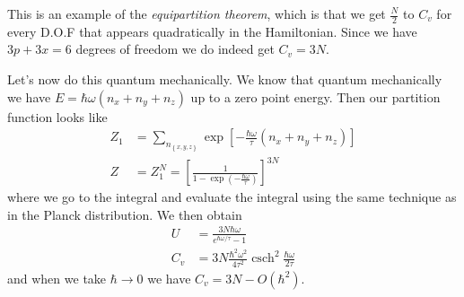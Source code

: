 \documentclass[10pt,twocolumn]{article}
\DeclareMathOperator{\csch}{csch}
\begin{document}
This is an example of the \emph{equipartition theorem}, which is that we get $\frac{N}{2}$ to $C_v$ for every D.O.F that appears quadratically in the Hamiltonian. Since we have $3p + 3x = 6$ degrees of freedom we do indeed get $C_v = 3N$.

Let's now do this quantum mechanically. We know that quantum mechanically we have $E = \hbar \omega\left( n_x + n_y + n_z \right)$ up to a zero point energy. Then our partition function looks like
\begin{align}
    Z_1 &= \sum\limits_{n_{ \left\{ x,y,z \right\}}}^{} \exp\left[ -\frac{\hbar \omega}{\tau}(n_x + n_y + n_z) \right]\\
    Z &= Z_1^N = \left[ \frac{1}{1 - \exp\left( -\frac{\hbar \omega}{\tau} \right)} \right]^{3N}
\end{align}
where we go to the integral and evaluate the integral using the same technique as in the Planck distribution. We then obtain
\begin{align}
    U &= \frac{3N\hbar \omega}{e^{\hbar \omega/\tau} - 1}\\
    C_v &= 3N\frac{\hbar^2 \omega^2}{4\tau^2}\csch^2\frac{\hbar \omega}{2\tau}
\end{align}
and when we take $\hbar \to 0$ we have $C_v = 3N - O(\hbar^2)$. 
\end{document}
